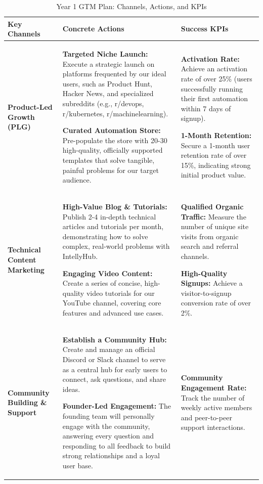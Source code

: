 \documentclass[11pt, a4paper, oneside]{article}
\begin{document}
\begin{table}[!htbp]
\centering
\caption{Year 1 GTM Plan: Channels, Actions, and KPIs}
\label{tab:gtm_year1}
\begin{tabular}{p{} p{} p{}}
\toprule
\textbf{Key Channels} & \textbf{Concrete Actions} & \textbf{Success KPIs} \\
\midrule
\textbf{Product-Led Growth (PLG)} & 
\textbf{Targeted Niche Launch:} Execute a strategic launch on platforms frequented by our ideal users, such as Product Hunt, Hacker News, and specialized subreddits (e.g., r/devops, r/kubernetes, r/machinelearning).

\textbf{Curated Automation Store:} Pre-populate the store with 20-30 high-quality, officially supported templates that solve tangible, painful problems for our target audience.
&
\textbf{Activation Rate:} Achieve an activation rate of over 25\% (users successfully running their first automation within 7 days of signup).

\textbf{1-Month Retention:} Secure a 1-month user retention rate of over 15\%, indicating strong initial product value.
\\
\addlinespace

\textbf{Technical Content Marketing} & 
\textbf{High-Value Blog \& Tutorials:} Publish 2-4 in-depth technical articles and tutorials per month, demonstrating how to solve complex, real-world problems with IntellyHub.

\textbf{Engaging Video Content:} Create a series of concise, high-quality video tutorials for our YouTube channel, covering core features and advanced use cases.
&
\textbf{Qualified Organic Traffic:} Measure the number of unique site visits from organic search and referral channels.

\textbf{High-Quality Signups:} Achieve a visitor-to-signup conversion rate of over 2\%.
\\
\addlinespace

\textbf{Community Building \& Support} &
\textbf{Establish a Community Hub:} Create and manage an official Discord or Slack channel to serve as a central hub for early users to connect, ask questions, and share ideas.

\textbf{Founder-Led Engagement:} The founding team will personally engage with the community, answering every question and responding to all feedback to build strong relationships and a loyal user base.
&
\textbf{Community Engagement Rate:} Track the number of weekly active members and peer-to-peer support interactions.


\end{tabular}
\end{table}
\end{document}
